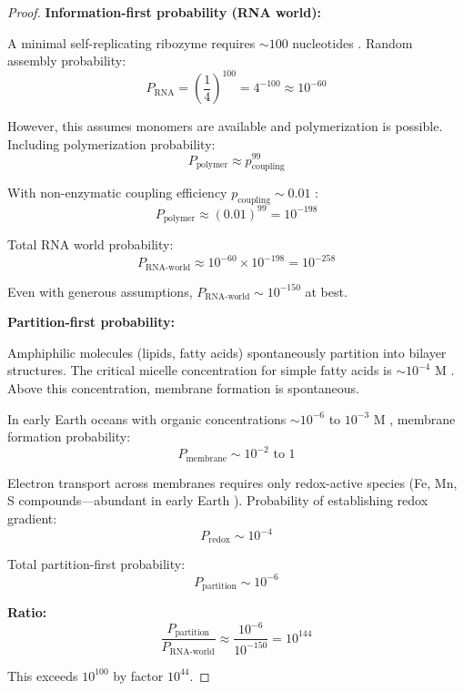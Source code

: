 \documentclass[twocolumn,10pt,a4paper]{article}
\theoremstyle{definition}
\theoremstyle{remark}
\begin{document}
\begin{proof}
\textbf{Information-first probability (RNA world):}

A minimal self-replicating ribozyme requires $\sim 100$ nucleotides \cite{joyce2007}. Random assembly probability:
\begin{equation}
    P_{\text{RNA}} = \left(\frac{1}{4}\right)^{100} = 4^{-100} \approx 10^{-60}
\end{equation}

However, this assumes monomers are available and polymerization is possible. Including polymerization probability:
\begin{equation}
    P_{\text{polymer}} \approx p_{\text{coupling}}^{99}
\end{equation}

With non-enzymatic coupling efficiency $p_{\text{coupling}} \sim 0.01$ \cite{orgel2004}:
\begin{equation}
    P_{\text{polymer}} \approx (0.01)^{99} = 10^{-198}
\end{equation}

Total RNA world probability:
\begin{equation}
    P_{\text{RNA-world}} \approx 10^{-60} \times 10^{-198} = 10^{-258}
\end{equation}

Even with generous assumptions, $P_{\text{RNA-world}} \sim 10^{-150}$ at best.

\textbf{Partition-first probability:}

Amphiphilic molecules (lipids, fatty acids) spontaneously partition into bilayer structures. The critical micelle concentration for simple fatty acids is $\sim 10^{-4}$ M \cite{tanford1980}. Above this concentration, membrane formation is spontaneous.

In early Earth oceans with organic concentrations $\sim 10^{-6}$ to $10^{-3}$ M \cite{miller1959}, membrane formation probability:
\begin{equation}
    P_{\text{membrane}} \sim 10^{-2} \text{ to } 1
\end{equation}

Electron transport across membranes requires only redox-active species (Fe, Mn, S compounds---abundant in early Earth \cite{russell2007}). Probability of establishing redox gradient:
\begin{equation}
    P_{\text{redox}} \sim 10^{-4}
\end{equation}

Total partition-first probability:
\begin{equation}
    P_{\text{partition}} \sim 10^{-6}
\end{equation}

\textbf{Ratio:}
\begin{equation}
    \frac{P_{\text{partition}}}{P_{\text{RNA-world}}} \approx \frac{10^{-6}}{10^{-150}} = 10^{144}
\end{equation}

This exceeds $10^{100}$ by factor $10^{44}$.
\end{proof}
\end{document}
